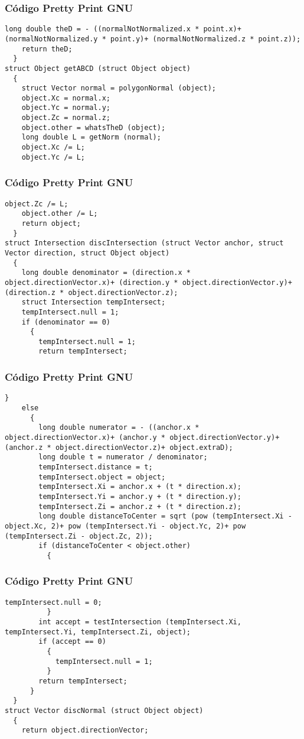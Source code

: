 \documentclass{beamer}
\begin{document}
\begin{frame}[fragile]
\frametitle{C\'odigo Pretty Print GNU}
\begin{lstlisting}[style=CStyle]
    long double theD = - ((normalNotNormalized.x * point.x)+ (normalNotNormalized.y * point.y)+ (normalNotNormalized.z * point.z));
    return theD;
  }
struct Object getABCD (struct Object object)
  {
    struct Vector normal = polygonNormal (object);
    object.Xc = normal.x;
    object.Yc = normal.y;
    object.Zc = normal.z;
    object.other = whatsTheD (object);
    long double L = getNorm (normal);
    object.Xc /= L;
    object.Yc /= L;
\end{lstlisting}
\end{frame}
\begin{frame}[fragile]
\frametitle{C\'odigo Pretty Print GNU}
\begin{lstlisting}[style=CStyle]
    object.Zc /= L;
    object.other /= L;
    return object;
  }
struct Intersection discIntersection (struct Vector anchor, struct Vector direction, struct Object object)
  {
    long double denominator = (direction.x * object.directionVector.x)+ (direction.y * object.directionVector.y)+ (direction.z * object.directionVector.z);
    struct Intersection tempIntersect;
    tempIntersect.null = 1;
    if (denominator == 0)
      {
        tempIntersect.null = 1;
        return tempIntersect;
\end{lstlisting}
\end{frame}
\begin{frame}[fragile]
\frametitle{C\'odigo Pretty Print GNU}
\begin{lstlisting}[style=CStyle]
      }
    else
      {
        long double numerator = - ((anchor.x * object.directionVector.x)+ (anchor.y * object.directionVector.y)+ (anchor.z * object.directionVector.z)+ object.extraD);
        long double t = numerator / denominator;
        tempIntersect.distance = t;
        tempIntersect.object = object;
        tempIntersect.Xi = anchor.x + (t * direction.x);
        tempIntersect.Yi = anchor.y + (t * direction.y);
        tempIntersect.Zi = anchor.z + (t * direction.z);
        long double distanceToCenter = sqrt (pow (tempIntersect.Xi - object.Xc, 2)+ pow (tempIntersect.Yi - object.Yc, 2)+ pow (tempIntersect.Zi - object.Zc, 2));
        if (distanceToCenter < object.other)
          {
            \end{lstlisting}
\end{frame}
\begin{frame}[fragile]
\frametitle{C\'odigo Pretty Print GNU}
\begin{lstlisting}[style=CStyle]
            tempIntersect.null = 0;
          }
        int accept = testIntersection (tempIntersect.Xi, tempIntersect.Yi, tempIntersect.Zi, object);
        if (accept == 0)
          {
            tempIntersect.null = 1;
          }
        return tempIntersect;
      }
  }
struct Vector discNormal (struct Object object)
  {
    return object.directionVector;
\end{lstlisting}
\end{frame}
\end{document}
